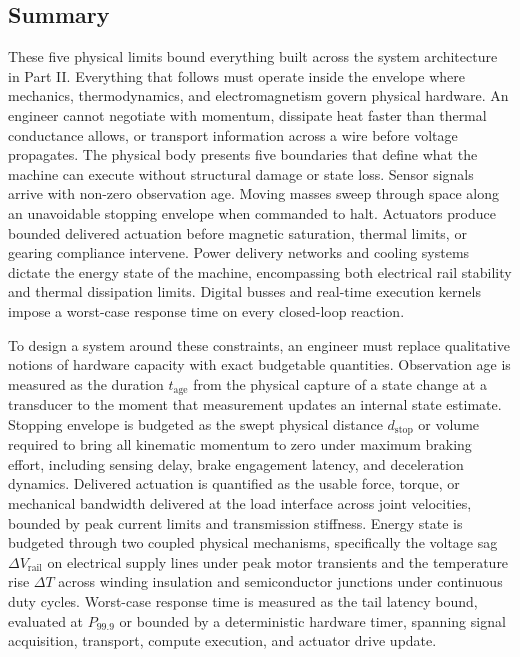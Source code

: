 \documentclass[
  letterpaper,
  DIV=11,
  numbers=noendperiod]{scrartcl}
\begin{document}
\subsection{Summary}\label{sec-body-2-9}

These five physical limits bound everything built across the system
architecture in Part II. Everything that follows must operate inside the
envelope where mechanics, thermodynamics, and electromagnetism govern
physical hardware. An engineer cannot negotiate with momentum, dissipate
heat faster than thermal conductance allows, or transport information
across a wire before voltage propagates. The physical body presents five
boundaries that define what the machine can execute without structural
damage or state loss. Sensor signals arrive with non-zero observation
age. Moving masses sweep through space along an unavoidable stopping
envelope when commanded to halt. Actuators produce bounded delivered
actuation before magnetic saturation, thermal limits, or gearing
compliance intervene. Power delivery networks and cooling systems
dictate the energy state of the machine, encompassing both electrical
rail stability and thermal dissipation limits. Digital busses and
real-time execution kernels impose a worst-case response time on every
closed-loop reaction.

To design a system around these constraints, an engineer must replace
qualitative notions of hardware capacity with exact budgetable
quantities. Observation age is measured as the duration
\(t_{\text{age}}\) from the physical capture of a state change at a
transducer to the moment that measurement updates an internal state
estimate. Stopping envelope is budgeted as the swept physical distance
\(d_{\text{stop}}\) or volume required to bring all kinematic momentum
to zero under maximum braking effort, including sensing delay, brake
engagement latency, and deceleration dynamics. Delivered actuation is
quantified as the usable force, torque, or mechanical bandwidth
delivered at the load interface across joint velocities, bounded by peak
current limits and transmission stiffness. Energy state is budgeted
through two coupled physical mechanisms, specifically the voltage sag
\(\Delta V_{\text{rail}}\) on electrical supply lines under peak motor
transients and the temperature rise \(\Delta T\) across winding
insulation and semiconductor junctions under continuous duty cycles.
Worst-case response time is measured as the tail latency bound,
evaluated at \(P_{99.9}\) or bounded by a deterministic hardware timer,
spanning signal acquisition, transport, compute execution, and actuator
drive update.
\end{document}
